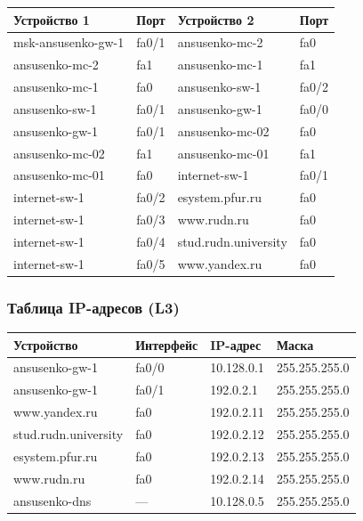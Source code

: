 \begin{center}
\begin{tabular}{|l|l|l|l|}
\hline
\textbf{Устройство 1} & \textbf{Порт} & \textbf{Устройство 2} & \textbf{Порт} \\
\hline
msk-ansusenko-gw-1 & fa0/1 & ansusenko-mc-2 & fa0 \\
ansusenko-mc-2 & fa1 & ansusenko-mc-1 & fa1 \\
ansusenko-mc-1 & fa0 & ansusenko-sw-1 & fa0/2 \\
ansusenko-sw-1 & fa0/1 & ansusenko-gw-1 & fa0/0 \\
ansusenko-gw-1 & fa0/1 & ansusenko-mc-02 & fa0 \\
ansusenko-mc-02 & fa1 & ansusenko-mc-01 & fa1 \\
ansusenko-mc-01 & fa0 & internet-sw-1 & fa0/1 \\
internet-sw-1 & fa0/2 & esystem.pfur.ru & fa0 \\
internet-sw-1 & fa0/3 & www.rudn.ru & fa0 \\
internet-sw-1 & fa0/4 & stud.rudn.university & fa0 \\
internet-sw-1 & fa0/5 & www.yandex.ru & fa0 \\
\hline
\end{tabular}
\end{center}

\subsubsection{Таблица IP-адресов (L3)}

\begin{center}
\begin{tabular}{|l|l|l|l|}
\hline
\textbf{Устройство} & \textbf{Интерфейс} & \textbf{IP-адрес} & \textbf{Маска} \\
\hline
ansusenko-gw-1 & fa0/0 & 10.128.0.1 & 255.255.255.0 \\
ansusenko-gw-1 & fa0/1 & 192.0.2.1 & 255.255.255.0 \\
www.yandex.ru & fa0 & 192.0.2.11 & 255.255.255.0 \\
stud.rudn.university & fa0 & 192.0.2.12 & 255.255.255.0 \\
esystem.pfur.ru & fa0 & 192.0.2.13 & 255.255.255.0 \\
www.rudn.ru & fa0 & 192.0.2.14 & 255.255.255.0 \\
ansusenko-dns & — & 10.128.0.5 & 255.255.255.0 \\
\hline
\end{tabular}
\end{center}

